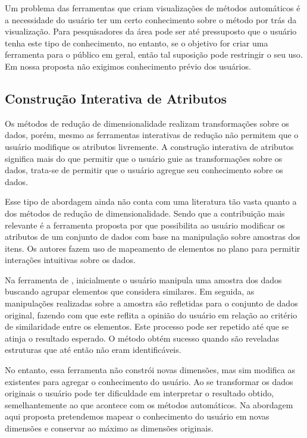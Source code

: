 Um problema das ferramentas que criam visualizações de
métodos automáticos é a necessidade do usuário ter um certo
conhecimento sobre o método por trás da visualização. Para
pesquisadores da área pode ser até pressuposto que o usuário
tenha este tipo de conhecimento, no entanto, se o objetivo
for criar uma ferramenta para o público em geral, então tal
suposição pode restringir o seu uso. Em nossa proposta não
exigimos conhecimento prévio dos usuários.

\subsection{Construção Interativa de Atributos}\label{sec:tr}

Os métodos de redução de dimensionalidade realizam
transformações sobre os dados, porém, mesmo as ferramentas
interativas de redução não permitem que o usuário modifique
os atributos livremente. A construção interativa de
atributos significa mais do que permitir que o usuário guie
as transformações sobre os dados, trata-se de permitir que o
usuário agregue seu conhecimento sobre os dados. 

Esse tipo de abordagem ainda não conta com uma literatura
tão vasta quanto a dos métodos de redução de
dimensionalidade. Sendo que a contribuição mais relevante é a
ferramenta proposta por \citet{Gladys2013} que possibilita ao
usuário modificar os atributos de um conjunto de dados com
base na manipulação sobre amostras dos itens. Os autores
fazem uso de mapeamento de elementos no plano para permitir
interações intuitivas sobre os dados. 

Na ferramenta de \citet{Gladys2013}, inicialmente o
usuário manipula uma amostra dos dados buscando  agrupar
elementos que considera similares. Em seguida, as
manipulações realizadas sobre a amostra são refletidas para
o conjunto de dados original, fazendo com que este reflita a
opinião do usuário em relação ao critério de similaridade
entre os elementos. Este processo pode ser repetido até que
se atinja o resultado esperado. O método obtém sucesso
quando são reveladas estruturas que até então não eram
identificáveis.

No entanto, essa ferramenta não constrói novas dimensões,
mas sim modifica as existentes para agregar o conhecimento
do usuário. Ao se transformar os dados originais o usuário
pode ter dificuldade em interpretar o resultado obtido,
semelhantemente ao que acontece com os métodos automáticos.
Na abordagem aqui proposta pretendemos mapear o conhecimento
do usuário em novas dimensões e conservar ao máximo as
dimensões originais.

